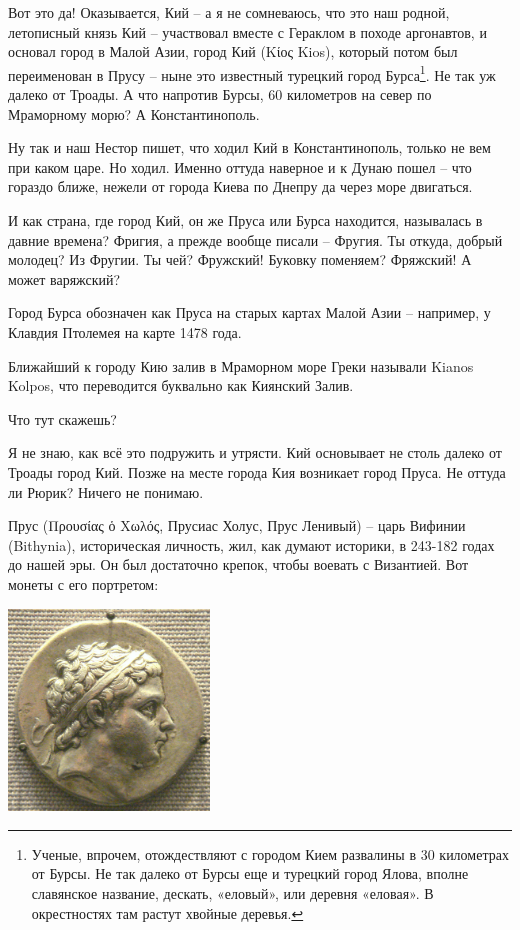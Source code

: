 Вот это да! Оказывается, Кий – а я не сомневаюсь, что это наш родной, летописный князь Кий – участвовал вместе с Гераклом в походе аргонавтов, и основал город в Малой Азии, город Кий (Kίος Kios), который потом был переименован в Прусу – ныне это известный турецкий город Бурса\footnote{Ученые, впрочем, отождествляют с городом Кием развалины в 30 километрах от Бурсы. Не так далеко от Бурсы еще и турецкий город Ялова, вполне славянское название, дескать, «еловый», или деревня «еловая». В окрестностях там растут хвойные деревья.}. Не так уж далеко от Троады. А что напротив Бурсы, 60 километров на север по Мраморному морю? А Константинополь. 

Ну так и наш Нестор пишет, что ходил Кий в Константинополь, только не вем при каком царе. Но ходил. Именно оттуда наверное и к Дунаю пошел – что гораздо ближе, нежели от города Киева по Днепру да через море двигаться.

И как страна, где город Кий, он же Пруса или Бурса находится, называлась в давние времена? Фригия, а прежде вообще писали – Фругия. Ты откуда, добрый молодец? Из Фругии. Ты чей? Фружский! Буковку поменяем? Фряжский! А может варяжский?

Город Бурса обозначен как Пруса на старых картах Малой Азии – например, у Клавдия Птолемея на карте 1478 года.

Ближайший к городу Кию залив в Мраморном море Греки называли Kianos Kolpos, что переводится буквально как Киянский Залив.

Что тут скажешь?

Я не знаю, как всё это подружить и утрясти. Кий основывает не столь далеко от Троады город Кий. Позже на месте города Кия возникает город Пруса. Не оттуда ли Рюрик? Ничего не понимаю.

Прус (Προυσίας ὁ Χωλός, Прусиас Холус, Прус Ленивый) – царь Вифинии (Bithynia), историческая личность, жил, как думают историки, в 243-182 годах до нашей эры. Он был достаточно крепок, чтобы воевать с Византией. Вот монеты с его портретом:

\begin{center}
\includegraphics[width=0.40\textwidth]{chast-troya/kiy-prussia/Prusias_I_of_Bithynia.jpg}
\end{center}

